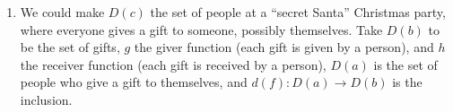 \documentclass[7Sketches]{subfiles}
\begin{document}
{\begin{enumerate}
	\[
	\begin{tikzpicture}
	\useasboundingbox (0.9, -1.1) rectangle (5.1, 0.1);
		\foreach \i in {1,2}{
			\foreach \j in {1,...,5}{
				\node at (\j,1-\i) (N\i\j) {$\bullet$};
			}
		}
		\draw[|->] (N11) -- (N24);
		\draw[|->] (N12) -- (N22);
		\draw[|->] (N13) -- (N25);
		\draw[|->] (N14) -- (N21);
		\draw[|->] (N15) -- (N23);
	\end{tikzpicture}
	\]
It's a do-si-do, a ``partner move,'' where everyone picks a partner (possibly themselves) and exchanges with them. One example one could take $D$ to be the set of pixels in a photograph, and take $s$ to be the function sending each pixel to its mirror image across the vertical center line of the photograph.
  \item We could make $D(c)$ the set of people at a ``secret Santa'' Christmas party, where everyone gives a gift to someone, possibly themselves. Take $D(b)$ to be the set of gifts, $g$ the giver function (each gift is given by a person), and $h$ the receiver function (each gift is received by a person), $D(a)$ is the set of people who give a gift to themselves, and $d(f)\colon D(a)\to D(b)$ is the inclusion.
\end{enumerate}
}
\end{document}
